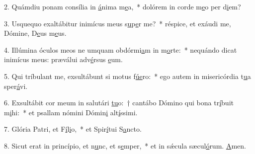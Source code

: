 2. Quámdiu ponam consília in \uline{á}nima m\uline{e}a,~* dolórem in corde m\uline{e}o per d\uline{i}em?\par 
3. Usquequo exaltábitur inimícus meus s\uline{u}p\uline{e}r me?~* réspice, et exáudi me, Dómine, D\uline{e}us m\uline{e}us.\par 
4. Illúmina óculos meos ne umquam obdórmi\uline{a}m in m\uline{o}rte:~* nequándo dicat inimícus meus: præválui adv\uline{é}rsus \uline{e}um.\par 
5. Qui tríbulant me, exsultábunt si motus f\uline{ú}\uline{e}ro:~* ego autem in misericórdia t\uline{u}a sper\uline{á}vi.\par 
6. Exsultábit cor meum in salutári \uline{tu}o:~† cantábo Dómino qui bona tr\uline{í}buit m\uline{i}hi:~* et psallam nómini Dómin\uline{i} alt\uline{í}ssimi.\par 
7. Glória Patri, et F\uline{í}l\uline{i}o,~* et Spir\uline{í}tui S\uline{a}ncto.\par 
8. Sicut erat in princípio, et n\uline{u}nc, et s\uline{e}mper,~* et in sǽcula sæcul\uline{ó}rum. \uline{A}men.\par 
